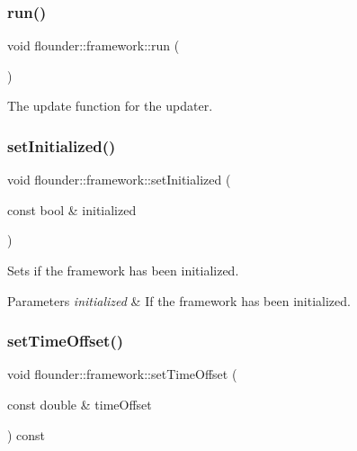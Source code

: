 \subsubsection{\texorpdfstring{run()}{run()}}
{\footnotesize\ttfamily void flounder\+::framework\+::run (\begin{DoxyParamCaption}{ }\end{DoxyParamCaption})}



The update function for the updater. 

\mbox{\label{classflounder_1_1framework_a06963c9a669b09c6e33547a6766432df}} 
\subsubsection{\texorpdfstring{set\+Initialized()}{setInitialized()}}
{\footnotesize\ttfamily void flounder\+::framework\+::set\+Initialized (\begin{DoxyParamCaption}\item[{const bool \&}]{initialized }\end{DoxyParamCaption})\hspace{0.3cm}{\ttfamily [inline]}}



Sets if the framework has been initialized. 


\begin{DoxyParams}{Parameters}
{\em initialized} & If the framework has been initialized. \\
\hline
\end{DoxyParams}
\mbox{\label{classflounder_1_1framework_aa4d08f34e622916ecd4a5f5f55bbac88}} 
\subsubsection{\texorpdfstring{set\+Time\+Offset()}{setTimeOffset()}}
{\footnotesize\ttfamily void flounder\+::framework\+::set\+Time\+Offset (\begin{DoxyParamCaption}\item[{const double \&}]{time\+Offset }\end{DoxyParamCaption}) const\hspace{0.3cm}{\ttfamily [inline]}}



